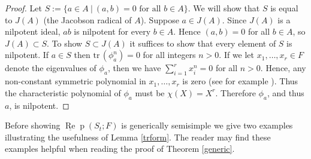 \documentclass{amsart}
\theoremstyle{definition}
\def\uRep{\underline{\operatorname{Re}}\!\operatorname{p}}
\newcommand{\tr}{\text{tr}\,}
\renewcommand{\1}{_{(1)}}
\renewcommand{\2}{_{(2)}}
\newcommand{\3}{_{(3)}}
\newcommand{\4}{_{(4)}}
\begin{document}
\begin{proof} Let $S:=\{a\in A~|~(a, b)=0\text{ for all }b\in A\}$.  We will show that $S$ is equal to $J(A)$ (the Jacobson radical of $A$).  Suppose $a\in J(A)$.  Since $J(A)$ is a nilpotent ideal, $ab$ is nilpotent for every $b\in A$.  Hence $(a, b)=0$ for all $b\in A$, so $J(A)\subset S$.  To show $S\subset J(A)$ it suffices to show that every element of $S$ is nilpotent.  
If $a\in S$ then $\tr(\phi_a^n)=0$ for all integers $n>0$.   If we let $x_1,\ldots, x_r\in F$ denote the eigenvalues of $\phi_a$, then we have $\sum_{i=1}^rx_i^n=0$ for all $n>0$.  Hence, any non-constant symmetric polynomial in $x_1,\ldots, x_r$ is zero (see for example \cite{MR1354144}).  Thus the characteristic polynomial of $\phi_a$ must be $\chi(X)=X^r$.  
Therefore $\phi_a$, and thus $a$, is nilpotent.  
\end{proof}

Before showing $\uRep(S_t; F)$ is generically semisimple we give two examples illustrating the usefulness of Lemma \ref{trform}.  The reader may find these examples helpful when reading the proof of Theorem \ref{generic}. 
\end{document}
